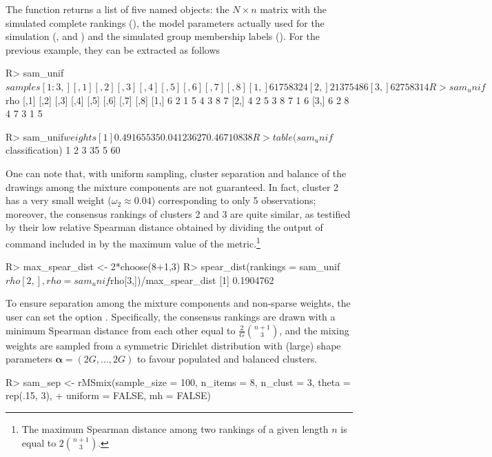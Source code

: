 The function  returns a list of five named objects: the $N\times n$ matrix with the simulated complete rankings (), the model parameters actually used for the simulation (,  and ) and the simulated group membership labels (). For the previous example, they can be extracted as follows
\begin{example}
R> sam_unif$samples[1:3,]
     [,1] [,2] [,3] [,4] [,5] [,6] [,7] [,8]
[1,]    6    1    7    5    8    3    2    4
[2,]    2    1    3    7    5    4    8    6
[3,]    6    2    7    5    8    3    1    4

R> sam_unif$rho
     [,1] [,2] [,3] [,4] [,5] [,6] [,7] [,8]
[1,]    6    2    1    5    4    3    8    7
[2,]    4    2    5    3    8    7    1    6
[3,]    6    2    8    4    7    3    1    5

R> sam_unif$weights
[1] 0.49165535 0.04123627 0.46710838

R> table(sam_unif$classification)
 1  2  3 
35  5 60
\end{example}
One can note that, with uniform sampling, cluster separation and balance of the drawings among the mixture components are not guaranteed. In fact, cluster 2 has a very small weight ($\omega_2 \approx 0.04$) corresponding to only 5 observations; moreover, the consensus rankings of clusters 2 and 3 are quite similar, as testified by their low relative Spearman distance obtained by dividing the output of command  included in  by the maximum value of the metric.\footnote{The maximum Spearman distance among two rankings of a given length $n$ is equal to $2\binom{n+1}{3}$.}
\begin{example}
R> max_spear_dist <- 2*choose(8+1,3)
R> spear_dist(rankings = sam_unif$rho[2,], rho = sam_unif$rho[3,])/max_spear_dist
[1] 0.1904762
\end{example}
To ensure separation among the mixture components and non-sparse weights, the user can set the option . Specifically, the consensus rankings are drawn with a minimum Spearman distance from each other equal to $\frac{2}{G}\binom{n+1}{3}$, and the mixing weights are sampled from a symmetric Dirichlet distribution with (large) shape parameters $\bm\alpha=(2G,\dots,2G)$ to favour populated and balanced clusters. 
\begin{example}
R> sam_sep <- rMSmix(sample_size = 100, n_items = 8, n_clust = 3, theta = rep(.15, 3),
+               uniform = FALSE, mh = FALSE)
\end{example}
